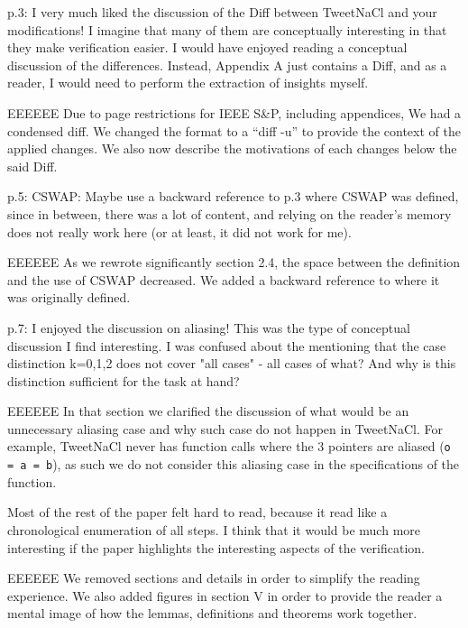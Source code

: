 p.3: I very much liked the discussion of the Diff between
TweetNaCl and your modifications! I imagine that many of
them are conceptually interesting in that they make verification
easier. I would have enjoyed reading a conceptual discussion
of the differences. Instead, Appendix A just contains a
Diff, and as a reader, I would need to perform the extraction
of insights myself.

\begin{answer}{EEEEEE}
  Due to page restrictions for IEEE S\&P, including appendices,
  We had a condensed diff. We changed the format to
  a ``diff -u'' to provide the context of the applied changes. We
  also now describe the motivations of each changes below
  the said Diff.
\end{answer}

p.5: CSWAP: Maybe use a backward reference to p.3 where
CSWAP was defined, since in between, there was a lot of
content, and relying on the reader's memory does not really
work here (or at least, it did not work for me).

\begin{answer}{EEEEEE}
  As we rewrote significantly section 2.4, the space between
  the definition and the use of CSWAP decreased. We added a
  backward reference to where it was originally defined.
\end{answer}

p.7: I enjoyed the discussion on aliasing! This was the type
of conceptual discussion I find interesting. I was confused
about the mentioning that the case distinction k=0,1,2 does
not cover "all cases" - all cases of what? And why is this
distinction sufficient for the task at hand?

\begin{answer}{EEEEEE}
  In that section we clarified the discussion of what
  would be an unnecessary aliasing case and why such case do
  not happen in TweetNaCl. For example, TweetNaCl never
  has function calls where the 3 pointers are aliased (\texttt{o = a = b}),
  as such we do not consider this aliasing case in the
  specifications of the function.
\end{answer}

Most of the rest of the paper felt hard to read, because it
read like a chronological enumeration of all steps. I think that
it would be much more interesting if the paper highlights the
interesting aspects of the verification.

\begin{answer}{EEEEEE}
  We removed sections and details in order to simplify the
  reading experience. We also added figures in section V in
  order to provide the reader a mental image of how the lemmas,
  definitions and theorems work together.
\end{answer}

